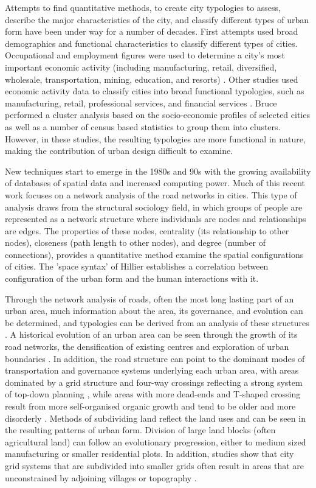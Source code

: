 \documentclass[10pt,letterpaper,hidelinks]{article}
\begin{document}
Attempts to find quantitative methods, to create city typologies to assess, describe the major characteristics of the city, and classify different types of urban form have been under way for a number of decades. First attempts used broad demographics and functional characteristics to classify different types of cities. Occupational and employment figures were used to determine a city's most important economic activity (including manufacturing, retail, diversified, wholesale, transportation, mining, education, and resorts) \cite{Harris1943}. Other studies used economic activity data to classify cities into broad functional typologies, such as manufacturing, retail, professional services, and financial services \cite{Nelson1955}. Bruce \cite{Bruce1971} performed a cluster analysis based on the socio-economic profiles of selected cities as well as a number of census based statistics to group them into clusters. However, in these studies, the resulting typologies are more functional in nature, making the contribution of urban design difficult to examine.

New techniques start to emerge in the 1980s and 90s with the growing availability of databases of spatial data and increased computing power. Much of this recent work focuses on a network analysis of the road networks in cities. This type of analysis draws from the structural sociology field, in which groups of people are represented as a network structure where individuals are nodes and relationships are edges. The properties of these nodes, centrality (its relationship to other nodes), closeness (path length to other nodes), and degree (number of connections), provides a quantitative method examine the spatial configurations of cities. The 'space syntax' of Hillier \cite{Hillier1996} establishes a correlation between configuration of the urban form and the human interactions with it. 

Through the network analysis of roads, often the most long lasting part of an urban area, much information about the area, its governance, and evolution can be determined, and typologies can be derived from an analysis of these structures \cite{Porta2006a}. A historical evolution of an urban area can be seen through the growth of its road networks, the densification of existing centres and exploration of urban boundaries \cite{Strano2012}. In addition, the road structure can point to the dominant modes of transportation and governance systems underlying each urban area, with areas dominated by a grid structure and four-way crossings reflecting a strong system of top-down planning \cite{Courtat2011}, while areas with more dead-ends and T-shaped crossing result from more self-organised organic growth \cite{Cardillo2006} and tend to be older and more disorderly \cite{Jacobs1961}. Methods of subdividing land reflect the land uses and can be seen in the resulting patterns of urban form. Division of large land blocks (often agricultural land) can follow an evolutionary progression, either to medium sized manufacturing or smaller residential plots. In addition, studies show that city grid systems that are subdivided into smaller grids often result in areas that are unconstrained by adjoining villages or topography \cite{Strano2012}. 
\end{document}
